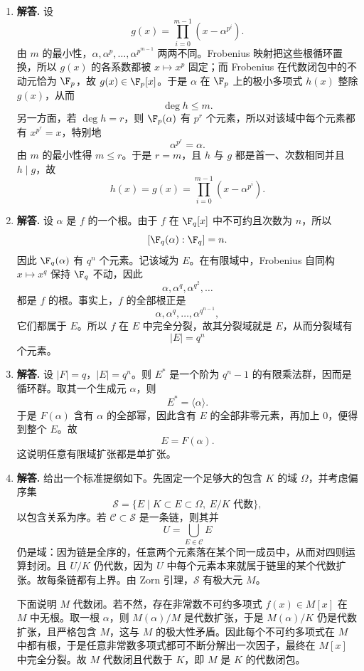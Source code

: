 \begin{enumerate}[label=\textbf{\arabic*.}, leftmargin=*, itemsep=1em]
\item \textbf{解答.} 设
\[
g(x)=\prod_{i=0}^{m-1}(x-\alpha^{p^i}).
\]
由 $m$ 的最小性，$\alpha,\alpha^p,\dots,\alpha^{p^{m-1}}$ 两两不同。Frobenius 映射把这些根循环置换，所以 $g(x)$ 的各系数都被 $x\mapsto x^p$ 固定；而 Frobenius 在代数闭包中的不动元恰为 $\F_p$，故 $g(x)\in\F_p[x]$。于是 $\alpha$ 在 $\F_p$ 上的极小多项式 $h(x)$ 整除 $g(x)$，从而
\[
\deg h\le m.
\]
另一方面，若 $\deg h=r$，则 $\F_p(\alpha)$ 有 $p^r$ 个元素，所以对该域中每个元素都有 $x^{p^r}=x$，特别地
\[
\alpha^{p^r}=\alpha.
\]
由 $m$ 的最小性得 $m\le r$。于是 $r=m$，且 $h$ 与 $g$ 都是首一、次数相同并且 $h\mid g$，故
\[
h(x)=g(x)=\prod_{i=0}^{m-1}(x-\alpha^{p^i}).
\]

\item \textbf{解答.} 设 $\alpha$ 是 $f$ 的一个根。由于 $f$ 在 $\F_q[x]$ 中不可约且次数为 $n$，所以
\[
[\F_q(\alpha):\F_q]=n.
\]
因此 $\F_q(\alpha)$ 有 $q^n$ 个元素。记该域为 $E$。在有限域中，Frobenius 自同构 $x\mapsto x^q$ 保持 $\F_q$ 不动，因此
\[
\alpha,\alpha^q,\alpha^{q^2},\dots
\]
都是 $f$ 的根。事实上，$f$ 的全部根正是
\[
\alpha,\alpha^q,\dots,\alpha^{q^{n-1}},
\]
它们都属于 $E$。所以 $f$ 在 $E$ 中完全分裂，故其分裂域就是 $E$，从而分裂域有
\[
|E|=q^n
\]
个元素。

\item \textbf{解答.} 设 $|F|=q$，$|E|=q^n$。则 $E^*$ 是一个阶为 $q^n-1$ 的有限乘法群，因而是循环群。取其一个生成元 $\alpha$，则
\[
E^*=\langle \alpha\rangle.
\]
于是 $F(\alpha)$ 含有 $\alpha$ 的全部幂，因此含有 $E$ 的全部非零元素，再加上 $0$，便得到整个 $E$。故
\[
E=F(\alpha).
\]
这说明任意有限域扩张都是单扩张。

\item \textbf{解答.} 给出一个标准提纲如下。先固定一个足够大的包含 $K$ 的域 $\Omega$，并考虑偏序集
\[
\mathcal S=\{E\mid K\subset E\subset\Omega,\ E/K\text{ 代数}\},
\]
以包含关系为序。若 $\mathcal C\subset\mathcal S$ 是一条链，则其并
\[
U=\bigcup_{E\in\mathcal C}E
\]
仍是域：因为链是全序的，任意两个元素落在某个同一成员中，从而对四则运算封闭。且 $U/K$ 仍代数，因为 $U$ 中每个元素本来就属于链里的某个代数扩张。故每条链都有上界。由 Zorn 引理，$\mathcal S$ 有极大元 $M$。

下面说明 $M$ 代数闭。若不然，存在非常数不可约多项式 $f(x)\in M[x]$ 在 $M$ 中无根。取一根 $\alpha$，则 $M(\alpha)/M$ 是代数扩张，于是 $M(\alpha)/K$ 仍是代数扩张，且严格包含 $M$，这与 $M$ 的极大性矛盾。因此每个不可约多项式在 $M$ 中都有根，于是任意非常数多项式都可不断分解出一次因子，最终在 $M[x]$ 中完全分裂。故 $M$ 代数闭且代数于 $K$，即 $M$ 是 $K$ 的代数闭包。


\end{enumerate}
